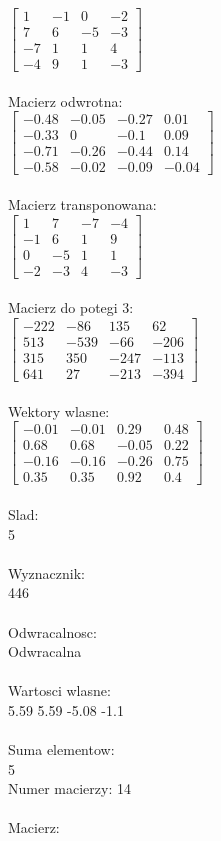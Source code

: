 \documentclass[a4paper,12pt]{article}
\begin{document}
$\begin{bmatrix} 1&-1&0&-2\\7&6&-5&-3\\-7&1&1&4\\-4&9&1&-3 \end{bmatrix}$
\\
\\
Macierz odwrotna:\\

$\begin{bmatrix} -0.48&-0.05&-0.27&0.01\\-0.33&0&-0.1&0.09\\-0.71&-0.26&-0.44&0.14\\-0.58&-0.02&-0.09&-0.04 \end{bmatrix}$
\\
\\
Macierz transponowana:\\

$\begin{bmatrix} 1&7&-7&-4\\-1&6&1&9\\0&-5&1&1\\-2&-3&4&-3 \end{bmatrix}$
\\
\\
Macierz do potegi 3:\\

$\begin{bmatrix} -222&-86&135&62\\513&-539&-66&-206\\315&350&-247&-113\\641&27&-213&-394 \end{bmatrix}$
\\
\\
Wektory wlasne:\\

$\begin{bmatrix} -0.01&-0.01&0.29&0.48\\0.68&0.68&-0.05&0.22\\-0.16&-0.16&-0.26&0.75\\0.35&0.35&0.92&0.4 \end{bmatrix}$
\\
\\
Slad:\\
5
\\
\\
Wyznacznik:\\
446
\\
\\
Odwracalnosc:\\
Odwracalna
\\
\\
Wartosci wlasne:\\
5.59 5.59 -5.08 -1.1
\\
\\
Suma elementow:\\
5
\\
\newpage
Numer macierzy:
14
\\
\\
Macierz:\\
\end{document}
